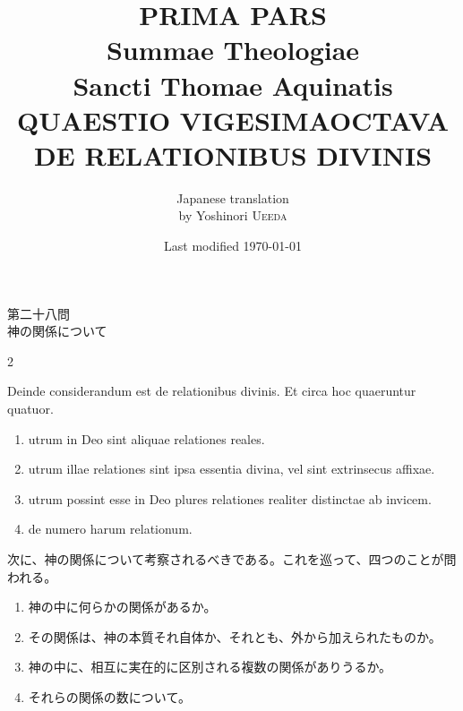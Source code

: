 \documentclass[paper=a4paper,fontsize=10pt,jafontsize=9pt,titlepage]{jlreq}
\title{{\bfseries PRIMA PARS}\\{\Huge Summae Theologiae}\\Sancti Thomae
Aquinatis\\{\sffamily QUAESTIO VIGESIMAOCTAVA}\\DE RELATIONIBUS DIVINIS}
\author{Japanese translation\\by Yoshinori {\scshape Ueeda}}
\date{Last modified \today}
\begin{document}
\maketitle
\begin{center}
{\Large 第二十八問\\神の関係について}
\end{center}

\begin{paracol}{2}

Deinde considerandum est de relationibus divinis. Et circa hoc quaeruntur
 quatuor.

\begin{enumerate}
 \item utrum in Deo sint aliquae relationes reales.
 \item utrum illae relationes sint ipsa essentia divina, vel sint extrinsecus affixae.
 \item utrum possint esse in Deo plures relationes realiter distinctae ab invicem.
 \item de numero harum relationum.
\end{enumerate}


\switchcolumn


次に、神の関係について考察されるべきである。これを巡って、四つのことが問われる。

\begin{enumerate}
 \item 神の中に何らかの関係があるか。
 \item その関係は、神の本質それ自体か、それとも、外から加えられたものか。
 \item 神の中に、相互に実在的に区別される複数の関係がありうるか。
 \item それらの関係の数について。
\end{enumerate}


\switchcolumn*



\end{paracol}

\newpage

{}
\setcounter{section}{28}
\setcounter{subsection}{0}
\end{document}
